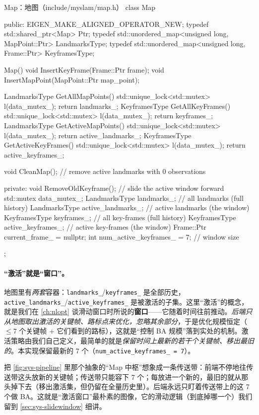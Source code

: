 \begin{codebox}[C++]{Map：地图（include/myslam/map.h）}
class Map {
   public:
    EIGEN_MAKE_ALIGNED_OPERATOR_NEW;
    typedef std::shared_ptr<Map> Ptr;
    typedef std::unordered_map<unsigned long, MapPoint::Ptr> LandmarksType;
    typedef std::unordered_map<unsigned long, Frame::Ptr> KeyframesType;

    Map() {}
    void InsertKeyFrame(Frame::Ptr frame);
    void InsertMapPoint(MapPoint::Ptr map_point);

    LandmarksType GetAllMapPoints()    { std::unique_lock<std::mutex> l(data_mutex_); return landmarks_; }
    KeyframesType GetAllKeyFrames()    { std::unique_lock<std::mutex> l(data_mutex_); return keyframes_; }
    LandmarksType GetActiveMapPoints() { std::unique_lock<std::mutex> l(data_mutex_); return active_landmarks_; }
    KeyframesType GetActiveKeyFrames() { std::unique_lock<std::mutex> l(data_mutex_); return active_keyframes_; }

    void CleanMap();                    // remove active landmarks with 0 observations

   private:
    void RemoveOldKeyframe();           // slide the active window forward
    std::mutex data_mutex_;
    LandmarksType landmarks_;           // all landmarks (full history)
    LandmarksType active_landmarks_;    // active landmarks (the window)
    KeyframesType keyframes_;           // all key-frames (full history)
    KeyframesType active_keyframes_;    // active key-frames (the window)
    Frame::Ptr current_frame_ = nullptr;
    int num_active_keyframes_ = 7;      // window size
};
\end{codebox}

\paragraph{“激活”就是“窗口”。}
地图里有\emph{两套}容器：\texttt{landmarks\_}/\texttt{keyframes\_} 是全部历史，\texttt{active\_landmarks\_}/\texttt{active\_keyframes\_} 是被激活的子集。这里“激活”的概念，就是我们在 \cref{ch:nlopt} 谈滑动窗口时所说的\textbf{窗口}——它随着时间往前推动。\emph{后端只从地图取出激活的关键帧、路标点来优化，忽略其余部分}，于是优化规模恒定（$\le 7$ 个关键帧 + 它们看到的路标），这就是“控制 BA 规模”落到实处的机制。激活策略由我们自己定义，最简单的就是\emph{保留时间上最新的若干个关键帧、移出最旧的}。本实现保留最新的 7 个（\texttt{num\_active\_keyframes\_ = 7}）。

\begin{insight}
把 \cref{fig:sys-pipeline} 里那个抽象的“Map 中枢”想象成一条传送带：前端不停地往传送带这头放新的关键帧；传送带只能容下 7 个；每放进一个新的，最旧的就从那头掉下去（移出激活集，但仍留在全量历史里）。后端永远只盯着传送带上的这 7 个做 BA。这就是“激活窗口”最朴素的图像，它的滑动逻辑（到底掉哪一个）我们留到 \cref{sec:sys-slidewindow} 细讲。
\end{insight}

